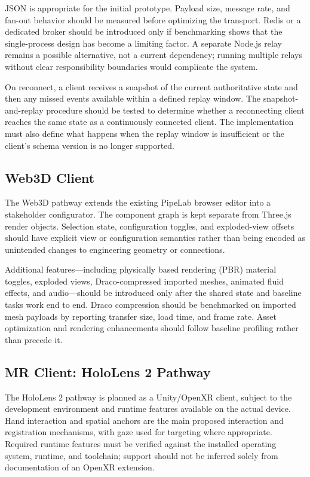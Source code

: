 \documentclass[conference]{IEEEtran}
\begin{document}
JSON is appropriate for the initial prototype. Payload size, message rate, and fan-out behavior should be measured before optimizing the transport. Redis or a dedicated broker should be introduced only if benchmarking shows that the single-process design has become a limiting factor. A separate Node.js relay remains a possible alternative, not a current dependency; running multiple relays without clear responsibility boundaries would complicate the system.

On reconnect, a client receives a snapshot of the current authoritative state and then any missed events available within a defined replay window. The snapshot-and-replay procedure should be tested to determine whether a reconnecting client reaches the same state as a continuously connected client. The implementation must also define what happens when the replay window is insufficient or the client's schema version is no longer supported.

\subsection{Web3D Client}
The Web3D pathway extends the existing PipeLab browser editor into a stakeholder configurator. The component graph is kept separate from Three.js render objects. Selection state, configuration toggles, and exploded-view offsets should have explicit view or configuration semantics rather than being encoded as unintended changes to engineering geometry or connections.

Additional features---including physically based rendering (PBR) material toggles, exploded views, Draco-compressed imported meshes, animated fluid effects, and audio---should be introduced only after the shared state and baseline tasks work end to end. Draco compression should be benchmarked on imported mesh payloads by reporting transfer size, load time, and frame rate. Asset optimization and rendering enhancements should follow baseline profiling rather than precede it.

\subsection{MR Client: HoloLens 2 Pathway}
The HoloLens 2 pathway is planned as a Unity/OpenXR client, subject to the development environment and runtime features available on the actual device. Hand interaction and spatial anchors are the main proposed interaction and registration mechanisms, with gaze used for targeting where appropriate. Required runtime features must be verified against the installed operating system, runtime, and toolchain; support should not be inferred solely from documentation of an OpenXR extension.
\end{document}
